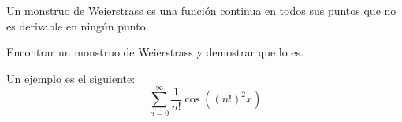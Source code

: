 \begin{definicion}
    Un monstruo de Weierstrass es una función continua en todos sus puntos que no es derivable en ningún punto.
\end{definicion}

\begin{ejercicio*}
    Encontrar un monstruo de Weierstrass y demostrar que lo es.

    Un ejemplo es el siguiente:
    \begin{equation*}
        \sum_{n=0}^\infty \frac{1}{n!}\cos\left((n!)^2 x\right)
    \end{equation*}
\end{ejercicio*}